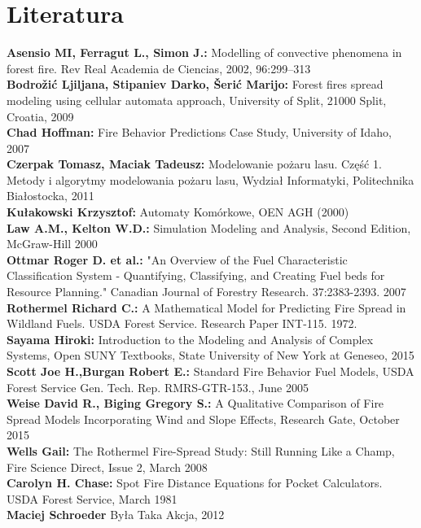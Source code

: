 \documentclass[a4paper, 11pt]{article}
\begin{document}
	\section{Literatura}
	\textbf{Asensio MI, Ferragut L., Simon J.:} Modelling of convective phenomena in forest fire. Rev Real Academia de Ciencias, 2002, 96:299–313\\
	\textbf{Bodrožić Ljiljana, Stipaniev Darko, Šerić Marijo:} Forest fires spread modeling using cellular automata approach, University of Split, 21000 Split, Croatia, 2009 \\
	\textbf{Chad Hoffman:} Fire Behavior Predictions Case Study, University of Idaho, 2007\\
	\textbf{Czerpak Tomasz, Maciak Tadeusz:} Modelowanie pożaru lasu. Część 1. Metody i algorytmy modelowania pożaru lasu, Wydział Informatyki, Politechnika Białostocka, 2011 \\
	\textbf{Kułakowski Krzysztof:} Automaty Komórkowe, OEN AGH (2000) \\
	\textbf{Law A.M., Kelton W.D.:} Simulation Modeling and Analysis, Second Edition, McGraw-Hill 2000\\
	\textbf{Ottmar Roger D. et al.:} "An Overview of the Fuel Characteristic Classification System - Quantifying, Classifying, and Creating Fuel beds for Resource Planning." Canadian Journal of Forestry Research. 37:2383-2393. 2007\\
	\textbf{Rothermel Richard C.:} A Mathematical Model for Predicting Fire Spread in Wildland Fuels. USDA Forest Service. Research Paper INT-115. 1972.\\
	\textbf{Sayama Hiroki:} Introduction to the Modeling and Analysis of Complex Systems, Open SUNY Textbooks, State University of New York at Geneseo, 2015\\	
	\textbf{Scott Joe H.,Burgan Robert E.:} Standard Fire Behavior Fuel Models, USDA Forest Service Gen. Tech. Rep. RMRS-GTR-153., June 2005\\	
	\textbf{Weise David R., Biging Gregory S.:} A Qualitative Comparison of Fire Spread Models Incorporating Wind and Slope Effects, Research Gate, October 2015\\
	\textbf{Wells Gail:} The Rothermel Fire-Spread Study: Still Running Like a Champ, Fire Science Direct, Issue 2, March 2008\\
	\textbf{Carolyn H. Chase:} Spot Fire Distance Equations for Pocket Calculators. USDA Forest Service, March 1981\\ 
	\textbf{Maciej Schroeder} Była Taka Akcja, 2012\\
	
	
	
\end{document}
